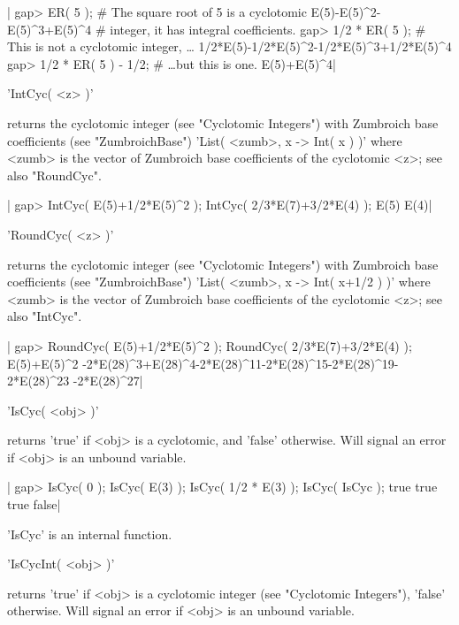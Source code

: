 |    gap> ER( 5 );                # The square root of 5 is a cyclotomic
    E(5)-E(5)^2-E(5)^3+E(5)^4    # integer, it has integral coefficients.
    gap> 1/2 * ER( 5 );          # This is not a cyclotomic integer, \ldots
    1/2*E(5)-1/2*E(5)^2-1/2*E(5)^3+1/2*E(5)^4
    gap> 1/2 * ER( 5 ) - 1/2;    # \ldots but this is one.
    E(5)+E(5)^4|


'IntCyc( <z> )'

returns  the  cyclotomic  integer  (see  "Cyclotomic  Integers")  with
Zumbroich base coefficients  (see "ZumbroichBase") 'List( <zumb>, x ->
Int( x ) )' where <zumb> is the  vector of Zumbroich base coefficients
of the cyclotomic <z>; see also "RoundCyc".

|    gap> IntCyc( E(5)+1/2*E(5)^2 ); IntCyc( 2/3*E(7)+3/2*E(4) );
    E(5)
    E(4)|


'RoundCyc( <z> )'

returns  the  cyclotomic  integer  (see  "Cyclotomic  Integers")  with
Zumbroich base coefficients (see "ZumbroichBase") 'List( <zumb>,  x ->
Int(  x+1/2  )  )' where  <zumb>  is  the  vector  of  Zumbroich  base
coefficients of the cyclotomic <z>; see also "IntCyc".

|    gap> RoundCyc( E(5)+1/2*E(5)^2 ); RoundCyc( 2/3*E(7)+3/2*E(4) );
    E(5)+E(5)^2
    -2*E(28)^3+E(28)^4-2*E(28)^11-2*E(28)^15-2*E(28)^19-2*E(28)^23
     -2*E(28)^27|


'IsCyc( <obj> )'

returns 'true' if <obj> is a cyclotomic, and 'false'  otherwise.  Will
signal an error if <obj> is an unbound variable.

|    gap> IsCyc( 0 ); IsCyc( E(3) ); IsCyc( 1/2 * E(3) ); IsCyc( IsCyc );
    true
    true
    true
    false|

'IsCyc' is an internal function.


'IsCycInt( <obj> )'

returns  'true'  if  <obj>  is a cyclotomic integer  (see  "Cyclotomic
Integers"), 'false'  otherwise.  Will signal  an  error if <obj> is an
unbound variable.

